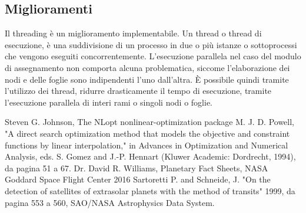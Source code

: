 \documentclass[a4paper,12pt]{report}
\begin{document}
\subsection{Miglioramenti}
Il threading è un miglioramento implementabile. Un thread o thread di esecuzione, è una suddivisione di un processo in due o più istanze o sottoprocessi che vengono eseguiti concorrentemente. L'esecuzione parallela nel caso del modulo di assegnamento non comporta alcuna problematica, siccome l'elaborazione dei nodi e delle foglie sono indipendenti l'uno dall'altra. È possibile quindi tramite l'utilizzo dei thread, ridurre drasticamente il tempo di esecuzione, tramite l'esecuzione parallela di interi rami o singoli nodi o foglie.



%
%
\begin{thebibliography}{00}
Steven G. Johnson, The NLopt nonlinear-optimization package
%
M. J. D. Powell, "A direct search optimization method that models the objective and constraint functions by linear interpolation," in Advances in Optimization and Numerical Analysis, eds. S. Gomez and J.-P. Hennart (Kluwer Academic: Dordrecht, 1994), da pagina 51 a 67.
%
Dr. David R. Williams, Planetary Fact Sheets, NASA Goddard Space Flight Center 2016
%
Sartoretti P. and Schneide, J. "On the detection of satellites of extrasolar planets with the method of transits" 1999, da pagina 553 a 560, SAO/NASA Astrophysics Data System.

\end{thebibliography}

%
\end{document}
